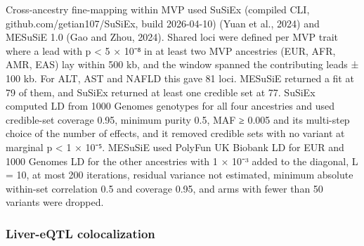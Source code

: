 Cross-ancestry fine-mapping within MVP used SuSiEx (compiled CLI, github.com/getian107/SuSiEx, build 2026-04-10) (Yuan et al., 2024) and MESuSiE 1.0 (Gao and Zhou, 2024). Shared loci were defined per MVP trait where a lead with p \textless{} 5 × 10⁻⁸ in at least two MVP ancestries (EUR, AFR, AMR, EAS) lay within 500 kb, and the window spanned the contributing leads ± 100 kb. For ALT, AST and NAFLD this gave 81 loci. MESuSiE returned a fit at 79 of them, and SuSiEx returned at least one credible set at 77. SuSiEx computed LD from 1000 Genomes genotypes for all four ancestries and used credible-set coverage 0.95, minimum purity 0.5, MAF ≥ 0.005 and its multi-step choice of the number of effects, and it removed credible sets with no variant at marginal p \textless{} 1 × 10⁻⁵. MESuSiE used PolyFun UK Biobank LD for EUR and 1000 Genomes LD for the other ancestries with 1 × 10⁻³ added to the diagonal, L = 10, at most 200 iterations, residual variance not estimated, minimum absolute within-set correlation 0.5 and coverage 0.95, and arms with fewer than 50 variants were dropped.

\subsubsection{Liver-eQTL colocalization}\label{liver-eqtl-colocalization}

